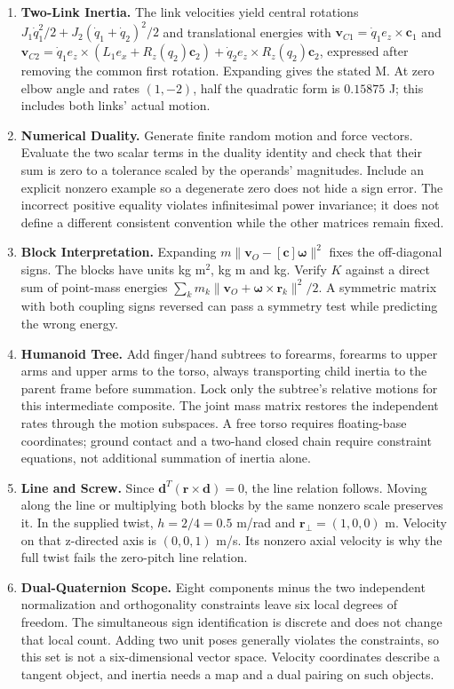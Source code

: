\begin{enumerate}
\item \textbf{Two-Link Inertia.} The link velocities yield central rotations $J_1\dot q_1^2/2+J_2(\dot q_1+\dot q_2)^2/2$ and translational energies with $\mathbf v_{C1}=\dot q_1 e_z\times\mathbf c_1$ and $\mathbf v_{C2}=\dot q_1 e_z\times(L_1 e_x+R_z(q_2)\mathbf c_2)+\dot q_2 e_z\times R_z(q_2)\mathbf c_2$, expressed after removing the common first rotation. Expanding gives the stated M. At zero elbow angle and rates $(1,-2)$, half the quadratic form is $0.15875$ J; this includes both links' actual motion.
\item \textbf{Numerical Duality.} Generate finite random motion and force vectors. Evaluate the two scalar terms in the duality identity and check that their sum is zero to a tolerance scaled by the operands' magnitudes. Include an explicit nonzero example so a degenerate zero does not hide a sign error. The incorrect positive equality violates infinitesimal power invariance; it does not define a different consistent convention while the other matrices remain fixed.
\item \textbf{Block Interpretation.} Expanding $m\|\mathbf v_O-[\mathbf c]\boldsymbol\omega\|^2$ fixes the off-diagonal signs. The blocks have units kg m$^2$, kg m and kg. Verify $K$ against a direct sum of point-mass energies $\sum_k m_k\|\mathbf v_O+\boldsymbol\omega\times\mathbf r_k\|^2/2$. A symmetric matrix with both coupling signs reversed can pass a symmetry test while predicting the wrong energy.
\item \textbf{Humanoid Tree.} Add finger/hand subtrees to forearms, forearms to upper arms and upper arms to the torso, always transporting child inertia to the parent frame before summation. Lock only the subtree's relative motions for this intermediate composite. The joint mass matrix restores the independent rates through the motion subspaces. A free torso requires floating-base coordinates; ground contact and a two-hand closed chain require constraint equations, not additional summation of inertia alone.
\item \textbf{Line and Screw.} Since $\mathbf d^T(\mathbf r\times\mathbf d)=0$, the line relation follows. Moving along the line or multiplying both blocks by the same nonzero scale preserves it. In the supplied twist, $h=2/4=0.5$ m/rad and $\mathbf r_\perp=(1,0,0)$ m. Velocity on that z-directed axis is $(0,0,1)$ m/s. Its nonzero axial velocity is why the full twist fails the zero-pitch line relation.
\item \textbf{Dual-Quaternion Scope.} Eight components minus the two independent normalization and orthogonality constraints leave six local degrees of freedom. The simultaneous sign identification is discrete and does not change that local count. Adding two unit poses generally violates the constraints, so this set is not a six-dimensional vector space. Velocity coordinates describe a tangent object, and inertia needs a map and a dual pairing on such objects.

\end{enumerate}
